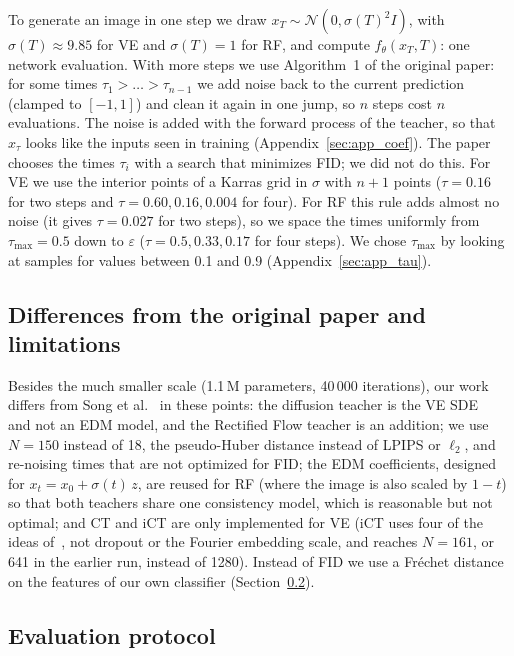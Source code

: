 \documentclass{article}
\begin{document}
To generate an image in one step we draw $x_T \sim \mathcal{N}(0, \sigma(T)^2 I)$,
with $\sigma(T) \approx 9.85$ for VE and $\sigma(T) = 1$ for RF, and compute
$f_\theta(x_T, T)$: one network evaluation. With more steps we use Algorithm~1 of
the original paper: for some times $\tau_1 > \dots > \tau_{n-1}$ we add noise back
to the current prediction (clamped to $[-1, 1]$) and clean it again in one jump,
so $n$ steps cost $n$ evaluations. The noise is added with the forward process of
the teacher, so that $x_\tau$ looks like the inputs seen in training
(Appendix~\ref{sec:app_coef}).
The paper chooses the times $\tau_i$ with a search that minimizes FID; we did not
do this. For VE we use the interior points of a Karras grid in $\sigma$ with
$n + 1$ points ($\tau = 0.16$ for two steps and $\tau = 0.60, 0.16, 0.004$ for
four). For RF this rule adds almost no noise (it gives $\tau = 0.027$ for two
steps), so we space the times uniformly from $\tau_\text{max} = 0.5$ down to
$\varepsilon$ ($\tau = 0.5, 0.33, 0.17$ for four steps). We chose
$\tau_\text{max}$ by looking at samples for values between 0.1 and 0.9
(Appendix~\ref{sec:app_tau}).

\subsection{Differences from the original paper and limitations}
\label{sec:differences}

Besides the much smaller scale (1.1\,M parameters, 40\,000 iterations), our work
differs from Song et al.~\cite{song2023consistency} in these points: the
diffusion teacher is the VE SDE~\cite{song2021sde} and not an EDM model, and the
Rectified Flow teacher is an addition; we use $N = 150$ instead of 18, the
pseudo-Huber distance instead of LPIPS or $\ell_2$, and re-noising times that are
not optimized for FID; the EDM coefficients, designed for
$x_t = x_0 + \sigma(t)\, z$, are reused for RF (where the image is also scaled by
$1 - t$) so that both teachers share one consistency model, which is reasonable
but not optimal; and CT and iCT are only implemented for VE (iCT uses four of the
ideas of~\cite{song2024improved}, not dropout or the Fourier embedding scale, and
reaches $N = 161$, or 641 in the earlier run, instead of 1280). Instead of FID we use a Fréchet distance on
the features of our own classifier (Section~\ref{sec:evaluation}).

\subsection{Evaluation protocol}
\label{sec:evaluation}
\end{document}
